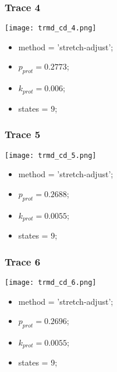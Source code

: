 \subsubsection{Trace 4}
\begin{minipage}[c]{0.7\textwidth}
	\texttt{[image: trmd\_cd\_4.png]}
\end{minipage}
\hfill
\begin{minipage}[c]{0.45\textwidth}
	\begin{itemize}
		\item method = 'stretch-adjust';
		\item $p_{prot}=0.2773$;
		\item $k_{prot}=0.006$;
		\item states = 9;
	\end{itemize}
\end{minipage}

\subsubsection{Trace 5}
\begin{minipage}[c]{0.7\textwidth}
	\texttt{[image: trmd\_cd\_5.png]}
\end{minipage}
\hfill
\begin{minipage}[c]{0.45\textwidth}
	\begin{itemize}
		\item method = 'stretch-adjust';
		\item $p_{prot}=0.2688$;
		\item $k_{prot}=0.0055$;
		\item states = 9;
	\end{itemize}
\end{minipage}

\subsubsection{Trace 6}
\begin{minipage}[c]{0.7\textwidth}
	\texttt{[image: trmd\_cd\_6.png]}
\end{minipage}
\hfill
\begin{minipage}[c]{0.45\textwidth}
	\begin{itemize}
		\item method = 'stretch-adjust';
		\item $p_{prot}=0.2696$;
		\item $k_{prot}=0.0055$;
		\item states = 9;
	\end{itemize}
\end{minipage}


